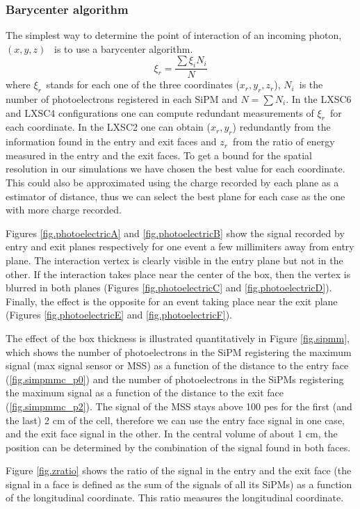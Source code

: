 \subsubsection*{Barycenter algorithm}
The simplest way to determine the point of interaction of an incoming photon, $(x,y,z)$~ is to use a barycenter algorithm. 
\[
\xi_r = \frac{\sum \xi_i N_i}{N}
\]
where $\xi_r$~stands for each one of the three coordinates ($x_r, y_r, z_r$), $N_i$~is the number of photoelectrons registered in each SiPM and $N=\sum N_i$. In the LXSC6 and LXSC4 configurations one can compute redundant measurements of $\xi_r$~for each coordinate. In the LXSC2 one can obtain ($x_r,y_r$) redundantly from the information found in the entry and exit faces and $z_r$~from the ratio of energy measured in the entry and the exit faces. To get a bound for the spatial resolution in our simulations we have chosen the best value for each coordinate. This could also be approximated using the charge recorded by each plane as a estimator of distance, thus we can select the best plane for each case as the one with more charge recorded.

Figures \ref{fig.photoelectricA} and \ref{fig.photoelectricB} show the signal recorded by entry and exit planes respectively for one event a few millimiters away from entry plane. The interaction vertex is clearly visible in the entry plane but not in the other. If the interaction takes place near the center of the box, then the vertex is blurred in both planes (Figures \ref{fig.photoelectricC} and \ref{fig.photoelectricD}). Finally, the effect is the opposite for an event taking place near the exit plane (Figures \ref{fig.photoelectricE} and \ref{fig.photoelectricF}). 

The effect of the box thickness is illustrated quantitatively in Figure \ref{fig.sipmm}, which shows the number of photoelectrons in the SiPM registering the maximum signal (max signal sensor or MSS) as a function of the distance to the entry face (\ref{fig.simpmmc_p0}) and the number of photoelectrons in the SiPMs registering the maximum signal as a function of the distance to the exit face (\ref{fig.simpmmc_p2}). The signal of the MSS stays above 100 pes for the first (and the last) 2 cm of the cell, therefore we can use the entry face signal in one case, and the exit face signal in the other. In the central volume of about 1 cm, the position can be determined by the combination of the signal found in both faces.

Figure \ref{fig.zratio} shows the ratio of the signal in the entry and the exit face (the signal in a face is defined as the sum of the signals of all its SiPMs) as a function of the longitudinal coordinate. This ratio measures the longitudinal coordinate.  

